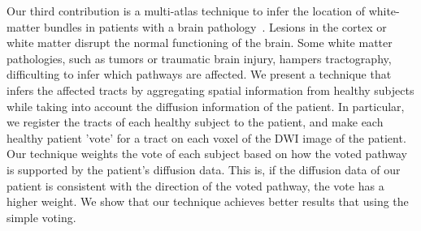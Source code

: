 Our third contribution is a multi-atlas technique to infer the location of 
white-matter bundles in patients with a brain pathology~\cite{Guillermo2018}.
Lesions in the cortex or white matter disrupt the normal functioning of the
brain. Some white matter pathologies, such as tumors or traumatic brain injury,
hampers tractography, difficulting to infer which pathways are affected. We 
present a technique that infers the affected tracts by aggregating spatial
information from healthy subjects while taking into account the diffusion
information of the patient. In particular, we register the tracts of each
healthy subject to the patient, and make each healthy patient 'vote' for a
tract on each voxel of the DWI image of the patient. Our technique weights the
vote of each subject based on how the voted pathway is supported by the patient's 
diffusion data. This is, if the diffusion data of our patient is consistent with
the direction of the voted pathway, the vote has a higher weight. We show that
our technique achieves better results that using the simple voting.

